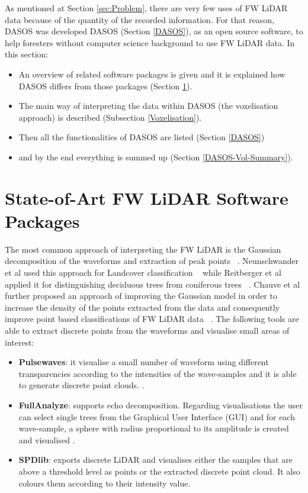 \documentclass{subfiles}
\begin{document}
	
	\par As mentioned at Section \ref{sec:Problem}, there are very few uses of FW LiDAR data because of the quantity of the recorded information. For that reason, DASOS was developed DASOS (Section \ref{DASOS}), as an open source software, to help foresters without computer science background to use FW LiDAR data. In this section:
	
	\begin{itemize}
		\item An overview of related software packages is given and it is explained how DASOS differs from those packages (Section \ref{LiDARsoftwares}).
		\item  The main way of interpreting the data within DASOS (the voxelisation approach) is described (Subsection \ref{Voxelisation}).
		\item Then all the functionalities of DASOS are listed (Section \ref{DASOS})
		\item and by the end everything is summed up (Section \ref{DASOS-Vol-Summary}).
	\end{itemize}
	
	
	\section{State-of-Art FW LiDAR Software Packages}\label{LiDARsoftwares}
	
	\par The most common approach of interpreting the FW LiDAR is the Gaussian decomposition of the waveforms and extraction of peak points ~\cite{Wanger2006}. Neunschwander et al used this approach for Landcover classification ~\cite{Neuenschwander2009} while Reitberger et al applied it for distinguishing deciduous trees from coniferous trees ~\cite{Reitberger2008}. Chauve et al further proposed an approach of improving the Gaussian model in order to increase the density of the points extracted from the data and consequently improve point based classifications of FW LiDAR data ~\cite{Chauve2007}.  The following tools are able to extract discrete points from the waveforms and visualise small areas of interest:
	 
	\begin{itemize}
		\item \textbf{Pulsewaves}: it visualise a small number of waveform using different transparencies according to the intensities of the wave-samples and it is able to generate discrete point clouds.  \cite{Isenburg2012Pulsewaves}.
	    \item \textbf{FullAnalyze}: supports echo decomposition. Regarding visualisations the user can select single trees from the Graphical User Interface (GUI) and for each wave-sample, a sphere with radius proportional to its amplitude is created and visualised \cite{Chauve2009}. 
    	\item \textbf{SPDlib}: exports discrete LiDAR and visualises either the samples that are above a threshold level as points or the extracted discrete point cloud. It also colours them according to their intensity value\cite{Bunting2013}. 
	\end{itemize}
\end{document}
